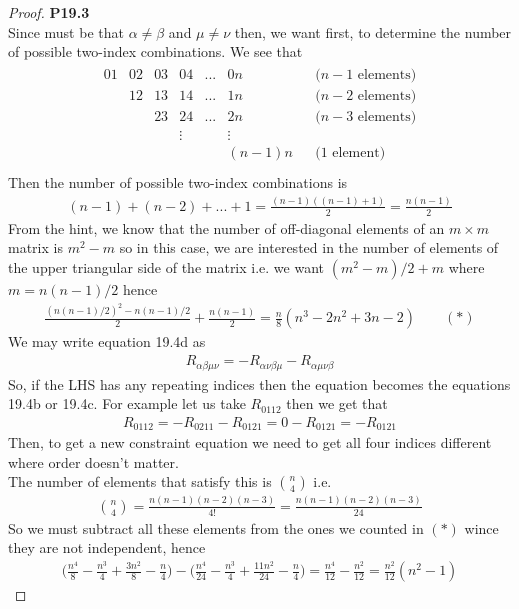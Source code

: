 \documentclass[11pt]{article}
\theoremstyle{definition}
\begin{document}
\cleardoublepage
\begin{proof}{\textbf{P19.3}}\\
Since must be that $\alpha \neq \beta$ and $\mu \neq \nu$ then,
we want first, to determine the number of possible two-index combinations.
We see that
\begin{align*}
\begin{matrix}
    01 & 02 & 03 & 04 & ... & 0n &   & \text{($n-1$ elements)}\\
       & 12 & 13 & 14 & ... & 1n &   & \text{($n-2$ elements)}\\
       &    & 23 & 24 & ... & 2n &   & \text{($n-3$ elements)}\\
     &  &  & \vdots &  & \vdots &   & \\
       &    &    &    &     & (n-1)n &   & \text{($1$ element)}\\
\end{matrix}
\end{align*}
Then the number of possible two-index combinations is
\begin{align*}
    (n-1) + (n-2) + ... + 1 = \frac{(n - 1)((n-1) + 1)}{2} = \frac{n(n-1)}{2}
\end{align*}
From the hint, we know that the number of off-diagonal elements of an $m \times m$
matrix is $m^2 - m$ so in this case, we are interested in the number of elements
of the upper triangular side of the matrix i.e. we want $(m^2 - m)/2 + m$ where
$m = n(n-1)/2$ hence
\begin{align*}
    \frac{(n(n-1)/2)^2 - n(n-1)/2}{2} + \frac{n(n-1)}{2}
    = \frac{n}{8}(n^3 - 2n^2 + 3n -2) \qquad (*)
\end{align*}
We may write equation 19.4d as
\begin{align*}
    R_{\alpha\beta\mu\nu} = -R_{\alpha\nu\beta\mu} -R_{\alpha\mu\nu\beta}
\end{align*}
So, if the LHS has any repeating indices then the equation becomes the equations
19.4b or 19.4c. For example let us take $R_{0112}$ then we get that
\begin{align*}
    R_{0112} = -R_{0211} -R_{0121} = 0 -R_{0121} = -R_{0121}
\end{align*}
Then, to get a new constraint equation we need to get all four indices
different where order doesn't matter.
\\
The number of elements that satisfy this is $\binom{n}{4}$ i.e.
\begin{align*}
    \binom{n}{4} = \frac{n(n-1)(n-2)(n-3)}{4!}
    = \frac{n(n-1)(n-2)(n-3)}{24}
\end{align*}
So we must subtract all these elements from the ones we counted in $(*)$
wince they are not independent, hence 
\begin{align*}
    \bigg(\frac{n^4}{8} - \frac{n^3}{4} + \frac{3n^2}{8} -\frac{n}{4}\bigg)
    - \bigg(\frac{n^4}{24} - \frac{n^3}{4} + \frac{11n^2}{24} -\frac{n}{4}\bigg)
    = \frac{n^4}{12} - \frac{n^2}{12} = \frac{n^2}{12}(n^2 - 1)
\end{align*}
\end{proof}
\end{document}
